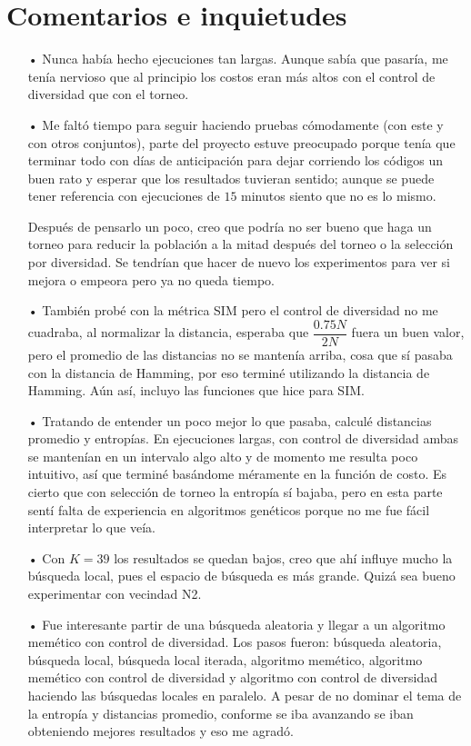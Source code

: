 \documentclass[10pt,a4paper]{article}
\begin{document}
\section{Comentarios e inquietudes}

\begin{enumerate}
\item[•] Nunca había hecho ejecuciones tan largas. Aunque sabía que pasaría, me tenía nervioso que al principio los costos eran más altos con el control de diversidad que con el torneo.

\item[•] Me faltó tiempo para seguir haciendo pruebas cómodamente (con este y con otros conjuntos), parte del proyecto estuve preocupado porque tenía que terminar todo con días de anticipación para dejar corriendo los códigos un buen rato y esperar que los resultados tuvieran sentido; aunque se puede tener referencia con ejecuciones de $15$ minutos siento que no es lo mismo.

\noindent Después de pensarlo un poco, creo que podría no ser bueno que haga un torneo para reducir la población a la mitad después del torneo o la selección por diversidad. Se tendrían que hacer de nuevo los experimentos para ver si mejora o empeora pero ya no queda tiempo.

\item[•] También probé con la métrica SIM pero el control de diversidad no me cuadraba, al normalizar la distancia, esperaba que $\dfrac{0{.}75 N}{2N}$ fuera un buen valor, pero el promedio de las distancias no se mantenía arriba, cosa que sí pasaba con la distancia de Hamming, por eso terminé utilizando la distancia de Hamming. Aún así, incluyo las funciones que hice para SIM.

\item[•] Tratando de entender un poco mejor lo que pasaba, calculé distancias promedio y entropías. En ejecuciones largas, con control de diversidad ambas se mantenían en un intervalo algo alto y de momento me resulta poco intuitivo, así que terminé basándome méramente en la función de costo. Es cierto que con selección de torneo la entropía sí bajaba, pero en esta parte sentí falta de experiencia en algoritmos genéticos porque no me fue fácil interpretar lo que veía.

\item[•] Con $K= 39$ los resultados se quedan bajos, creo que ahí influye mucho la búsqueda local, pues el espacio de búsqueda es más grande. Quizá sea bueno experimentar con vecindad N2. 

\item[•] Fue interesante partir de una búsqueda aleatoria y llegar a un algoritmo memético con control de diversidad. Los pasos fueron: búsqueda aleatoria, búsqueda local, búsqueda local iterada, algoritmo memético, algoritmo memético con control de diversidad y algoritmo con control de diversidad haciendo las búsquedas locales en paralelo. A pesar de no dominar el tema de la entropía y distancias promedio, conforme se iba avanzando se iban obteniendo mejores resultados y eso me agradó.

\end{enumerate}
\end{document}
